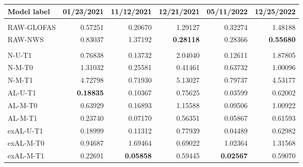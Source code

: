 \begin{center}
\scriptsize
\setlength{\tabcolsep}{4pt}
\begin{tabular}{>{\ttfamily}l rrrrr}
\toprule
Model label & 01/23/2021 & 11/12/2021 & 12/21/2021 & 05/11/2022 & 12/25/2022 \\
\midrule
\multicolumn{6}{l}{\textit{Raw forecast products}} \\
RAW-GLOFAS & 0.57251 & 0.20670 & 1.29127 & 0.32274 & 1.48188 \\
RAW-NWS & 0.83037 & 1.37192 & \textbf{0.28118} & 0.28366 & \textbf{0.55680} \\
\midrule
\multicolumn{6}{l}{\textit{Bayesian benchmark variants}} \\
N-U-T1 & 0.76838 & 0.13732 & 2.04040 & 0.12611 & 1.87805 \\
N-M-T0 & 1.31032 & 0.25581 & 0.41461 & 0.63732 & 1.00096 \\
N-M-T1 & 4.72798 & 0.71930 & 5.13027 & 0.79737 & 4.53177 \\
AL-U-T1 & \textbf{0.18835} & 0.10367 & 0.75625 & 0.03599 & 0.62002 \\
AL-M-T0 & 0.63929 & 0.16893 & 1.15588 & 0.09506 & 1.00922 \\
AL-M-T1 & 0.23740 & 0.07170 & 0.56351 & 0.05867 & 0.61593 \\
exAL-U-T1 & 0.18999 & 0.11312 & 0.77939 & 0.04489 & 0.62982 \\
exAL-M-T0 & 0.94687 & 1.69464 & 0.69022 & 1.02364 & 1.31568 \\
exAL-M-T1 & 0.22691 & \textbf{0.05858} & 0.59445 & \textbf{0.02567} & 0.59070 \\
\bottomrule
\end{tabular}
\end{center}

